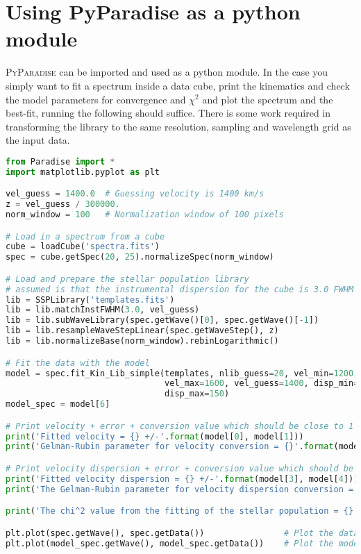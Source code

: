 \documentclass[usenatbib,usegraphicx,useAMS,onecolumn]{mn2e}
\begin{document}
\section{Using PyParadise as a python module}
\label{sec:paradise_lib}
\textsc{PyParadise} can be imported and used as a python module.
In the case you simply want to fit a spectrum inside a data cube, print the kinematics and check the model parameters for convergence and $\chi^2$ and plot the spectrum and the best-fit, running the following should suffice.
There is some work required in transforming the library to the same resolution, sampling and wavelength grid as the input data.
\begin{lstlisting}[language=python, showstringspaces=False, frame=tb,
                   keywordstyle=\color{deepblue}, emphstyle=\color{deepred}, stringstyle=\color{deepgreen}]
from Paradise import *
import matplotlib.pyplot as plt

vel_guess = 1400.0  # Guessing velocity is 1400 km/s
z = vel_guess / 300000.
norm_window = 100   # Normalization window of 100 pixels

# Load in a spectrum from a cube
cube = loadCube('spectra.fits')
spec = cube.getSpec(20, 25).normalizeSpec(norm_window)

# Load and prepare the stellar population library
# assumed is that the instrumental dispersion for the cube is 3.0 FWHM angstrom
lib = SSPLibrary('templates.fits') 
lib = lib.matchInstFWHM(3.0, vel_guess)
lib = lib.subWaveLibrary(spec.getWave()[0], spec.getWave()[-1])
lib = lib.resampleWaveStepLinear(spec.getWaveStep(), z)
lib = lib.normalizeBase(norm_window).rebinLogarithmic()

# Fit the data with the model
model = spec.fit_Kin_Lib_simple(templates, nlib_guess=20, vel_min=1200,
                                vel_max=1600, vel_guess=1400, disp_min=50,
                                disp_max=150)
model_spec = model[6]

# Print velocity + error + conversion value which should be close to 1
print('Fitted velocity = {} +/-'.format(model[0], model[1]))
print('Gelman-Rubin parameter for velocity conversion = {}'.format(mode[2]))

# Print velocity dispersion + error + conversion value which should be close to 1
print('Fitted velocity dispersion = {} +/-'.format(model[3], model[4]))
print('The Gelman-Rubin parameter for velocity dispersion conversion = {}'.format(mode[5]))

print('The chi^2 value from the fitting of the stellar population = {}'.format(mode[-1]))

plt.plot(spec.getWave(), spec.getData())                # Plot the data
plt.plot(model_spec.getWave(), model_spec.getData())    # Plot the model
\end{lstlisting}
\end{document}
